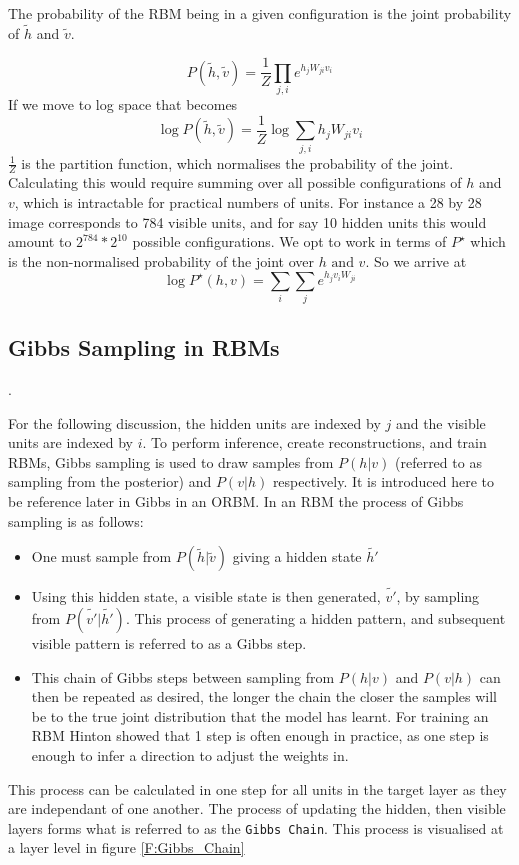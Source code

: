   The probability of the RBM being in a given configuration is the joint probability of $\tilde{h}$ and $\tilde{v}$.


  $$ P(\tilde{h},\tilde{v}) = \frac{1}{Z} \prod_{j,i} e^{h_jW_{ji}v_i} $$
  If we move to log space that becomes
  $$ \log P(\tilde{h},\tilde{v}) = \frac{1}{Z} \log \sum_{j,i} h_j W_{ji} v_i $$
  $\frac{1}{Z} $ is the partition function, which normalises the probability of the joint. Calculating this would require summing over all possible configurations of $h$ and $v$, which is intractable for practical numbers of units. For instance a 28 by 28 image corresponds to 784 visible units, and for say 10 hidden units this would amount to $2^{784} * 2^{10} $ possible configurations. We opt to work in terms of $P^\star$ which is the non-normalised probability of the joint over $h \text{ and } v$.
  So we arrive at
  \begin{equation}\label{eq:LogPJoint}
     \log P^\star(h, v) = \sum_i \sum_j e^{h_j v_i W_{ji}}
  \end{equation}

  \subsection{Gibbs Sampling in RBMs}

    .

  For the following discussion, the hidden units are indexed by $j$ and the visible units are indexed by $i$.
  To perform inference, create reconstructions, and train RBMs, Gibbs sampling is used to draw samples from $P(h|v)$ (referred to as sampling from the posterior) and $P(v|h)$ respectively. It is introduced here to be reference later in Gibbs in an ORBM. In an RBM the process of Gibbs sampling is as follows:
  \begin{itemize}
    \item One must sample from $P(\tilde{h}|\tilde{v})$ giving a hidden state $\tilde{h'}$
    \item Using this hidden state, a visible state is then generated, $\tilde{v'}$, by sampling from $P(\tilde{v'}|\tilde{h'})$. This process of generating a hidden pattern, and subsequent visible pattern is referred to as a Gibbs step.
    \item This chain of Gibbs steps between sampling from $P(h|v)$ and $P(v|h)$ can then be repeated as desired, the longer the chain the closer the samples will be to the true joint distribution that the model has learnt. For training an RBM Hinton showed that 1 step is often enough in practice, as one step is enough to infer a direction to adjust the weights in.
  \end{itemize}
   This process can be calculated in one step for all units in the target layer as they are independant of one another. The process of updating the hidden, then visible layers forms what is referred to as the \texttt{Gibbs Chain}.  This process is visualised at a layer level in figure \ref{F:Gibbs_Chain}

